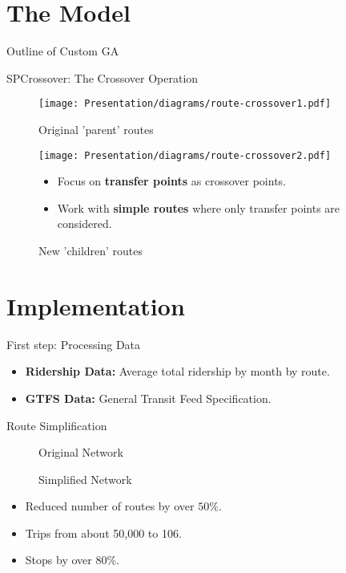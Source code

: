 \documentclass{beamer}
\begin{document}
\section{The Model}

\begin{frame}{Outline of Custom GA}
\end{frame}

\begin{frame}{SPCrossover: The Crossover Operation}
\begin{figure}
  \texttt{[image: Presentation/diagrams/route-crossover1.pdf]}
  \caption{Original 'parent' routes}\label{fig:parents}
\endminipage\hfill
{}%
  \texttt{[image: Presentation/diagrams/route-crossover2.pdf]}
  \caption{New 'children' routes}\label{fig:children}
\endminipage
\begin{itemize}
    \item Focus on \textbf{transfer points} as crossover points. 
    \item Work with \textbf{simple routes} where only transfer points are considered. 
\end{itemize}
\end{figure}
\end{frame}

\section{Implementation}
\begin{frame}{First step: Processing Data}
    \begin{itemize}
        \item \textbf{Ridership Data:} Average total ridership by month by route. 
        \item \textbf{GTFS Data:} General Transit Feed Specification. 
    \end{itemize}
\end{frame}

\begin{frame}{Route Simplification}
    \begin{figure}[!htb]
  \caption{Original Network}\label{fig:original-network}
\endminipage
{}%
  \caption{Simplified Network}\label{fig:simplified-network}
\endminipage
\end{figure}
\begin{itemize}
        \item Reduced number of routes by over $50\%$. 
        \item Trips from about 50,000 to 106. 
        \item Stops by over $80\%$.
    \end{itemize}
\end{frame}
\end{document}
